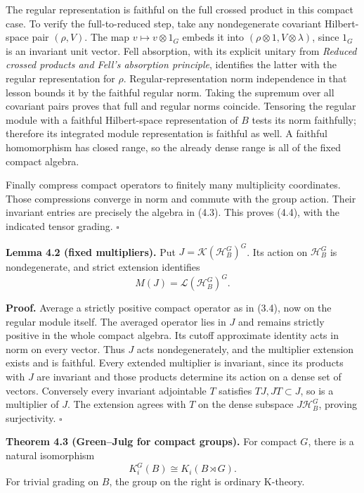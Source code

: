 \documentclass[
  11pt,
]{article}
\begin{document}
The regular representation is faithful on the full crossed product in
this compact case. To verify the full-to-reduced step, take any
nondegenerate covariant Hilbert-space pair \((\rho,V)\). The map
\(v\mapsto v\otimes1_G\) embeds it into
\((\rho\otimes1,V\otimes\lambda)\), since \(1_G\) is an invariant unit
vector. Fell absorption, with its explicit unitary from \emph{Reduced
crossed products and Fell's absorption principle}, identifies the latter
with the regular representation for \(\rho\). Regular-representation
norm independence in that lesson bounds it by the faithful regular norm.
Taking the supremum over all covariant pairs proves that full and
regular norms coincide. Tensoring the regular module with a faithful
Hilbert-space representation of \(B\) tests its norm faithfully;
therefore its integrated module representation is faithful as well. A
faithful homomorphism has closed range, so the already dense range is
all of the fixed compact algebra.

Finally compress compact operators to finitely many multiplicity
coordinates. Those compressions converge in norm and commute with the
group action. Their invariant entries are precisely the algebra in
(4.3). This proves (4.4), with the indicated tensor grading. \(\square\)

\textbf{Lemma 4.2 (fixed multipliers).} Put
\(J=\mathcal K(\mathcal H_B^G)^G\). Its action on \(\mathcal H_B^G\) is
nondegenerate, and strict extension identifies \[
M(J)=\mathcal L(\mathcal H_B^G)^G.
\tag{4.7}
\]

\textbf{Proof.} Average a strictly positive compact operator as in
(3.4), now on the regular module itself. The averaged operator lies in
\(J\) and remains strictly positive in the whole compact algebra. Its
cutoff approximate identity acts in norm on every vector. Thus \(J\)
acts nondegenerately, and the multiplier extension exists and is
faithful. Every extended multiplier is invariant, since its products
with \(J\) are invariant and those products determine its action on a
dense set of vectors. Conversely every invariant adjointable \(T\)
satisfies \(TJ,JT\subset J\), so is a multiplier of \(J\). The extension
agrees with \(T\) on the dense subspace \(J\mathcal H_B^G\), proving
surjectivity. \(\square\)

\textbf{Theorem 4.3 (Green--Julg for compact groups).} For compact
\(G\), there is a natural isomorphism \[
K_i^G(B)\cong K_i(B\rtimes G).
\tag{4.8}
\] For trivial grading on \(B\), the group on the right is ordinary
K-theory.
\end{document}
